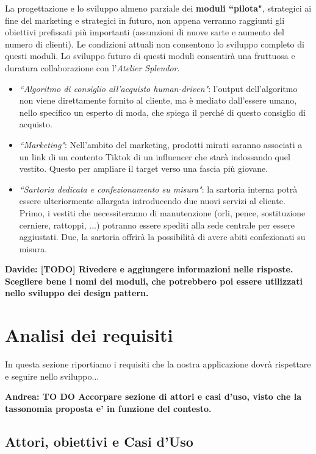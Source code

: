 \documentclass[12pt]{article}
\newcommand{\andrea}[1]{{\bf \color{mauve} Andrea: #1 }}
\newcommand{\davide}[1]{{\bf \color{chromeyellow} Davide: #1 }}
\begin{document}
La progettazione e lo sviluppo almeno parziale dei \textbf{moduli ``pilota"}, strategici ai fine del marketing e strategici in futuro, non appena verranno raggiunti gli obiettivi prefissati più importanti (assunzioni di nuove sarte e aumento del numero di clienti). Le condizioni attuali non consentono lo sviluppo completo di questi moduli. Lo sviluppo futuro di questi moduli consentirà una fruttuosa e duratura collaborazione con l'{\em Atelier Splendor}.
\begin{itemize}
    \item {\em ``Algoritmo di consiglio all'acquisto human-driven"}: l'output dell'algoritmo non viene direttamente fornito al cliente, ma è mediato dall'essere umano, nello specifico un esperto di moda, che spiega il perché di questo consiglio di acquisto.
    \item {\em ``Marketing"}: Nell'ambito del marketing, prodotti mirati saranno associati a un link di un contento Tiktok di un influencer che starà indossando quel vestito. Questo per ampliare il target verso una fascia più giovane.
    \item {\em ``Sartoria dedicata e confezionamento su misura"}: la sartoria interna potrà essere ulteriormente allargata introducendo due nuovi servizi al cliente. Primo, i vestiti che necessiteranno di manutenzione (orli, pence, sostituzione cerniere, rattoppi, ...) potranno essere spediti alla sede centrale per essere aggiustati. Due, la sartoria offrirà la possibilità di avere abiti confezionati su misura.
\end{itemize}

\davide{\textbf{[TODO]} Rivedere e aggiungere informazioni nelle risposte. Scegliere bene i nomi dei moduli, che potrebbero poi essere utilizzati nello sviluppo dei design pattern.}

\section{Analisi dei requisiti}

In questa sezione riportiamo i requisiti che la nostra applicazione dovrà rispettare e seguire nello sviluppo...

\andrea{\textbf{TO DO} Accorpare sezione di attori e casi d'uso, visto che la tassonomia proposta e' in funzione del contesto.}

\subsection{Attori, obiettivi e Casi d'Uso}
\label{subsec:UC}
\end{document}
